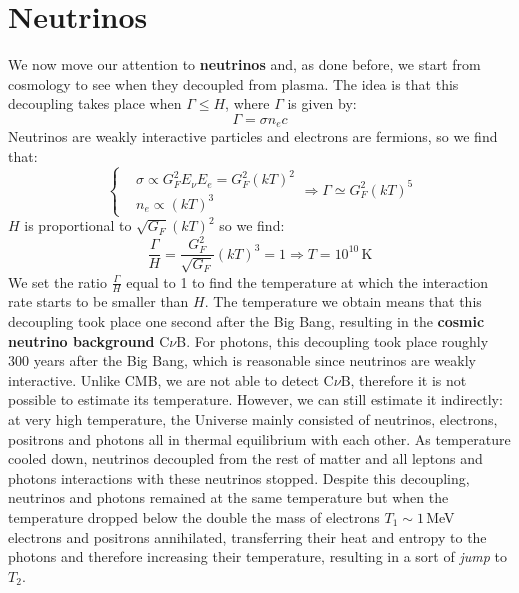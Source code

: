 \documentclass[10.75pt,a4paper,openright,bottom=2cm]{article}
\begin{document}
\section{Neutrinos}
We now move our attention to \textbf{neutrinos} and, as done before, we start from cosmology to see when they decoupled from plasma. The idea is that this decoupling takes place when $\Gamma\le H$, where $\Gamma$ is given by:
\[
\Gamma=\sigma n_ec
\]
Neutrinos are weakly interactive particles and electrons are fermions, so we find that:
\[
\left\{
\begin{aligned}
&\sigma\propto G_F^2E_\nu E_e=G_F^2(kT)^2\\
&n_e\propto(kT)^3
\end{aligned}
\right.
\Rightarrow\Gamma\simeq G_F^2(kT)^5
\]
$H$ is proportional to $\sqrt{G_F}(kT)^2$ so we find:
\[
\frac{\Gamma}{H}=\frac{G_F^2}{\sqrt{G_F}}(kT)^3=1\Rightarrow T=10^{10}\,\text{K}
\]
We set the ratio $\frac{\Gamma}{H}$ equal to 1 to find the temperature at which the interaction rate starts to be smaller than $H$. The temperature we obtain means that this decoupling took place one second after the Big Bang, resulting in the \textbf{cosmic neutrino background} C$\nu$B. For photons, this decoupling took place roughly 300 years after the Big Bang, which is reasonable since neutrinos are weakly interactive. Unlike CMB, we are not able to detect C$\nu$B, therefore it is not possible to estimate its temperature. However, we can still estimate it indirectly: at very high temperature, the Universe mainly consisted of neutrinos, electrons, positrons and photons all in thermal equilibrium with each other. As temperature cooled down, neutrinos decoupled from the rest of matter and all leptons and photons interactions with these neutrinos stopped. Despite this decoupling, neutrinos and photons remained at the same temperature but when the temperature dropped below the double the mass of electrons $T_1\sim1$\,MeV electrons and positrons annihilated, transferring their heat and entropy to the photons and therefore increasing their temperature, resulting in a sort of \textit{jump} to $T_2$.
\begin{center}
\end{center}
\end{document}
